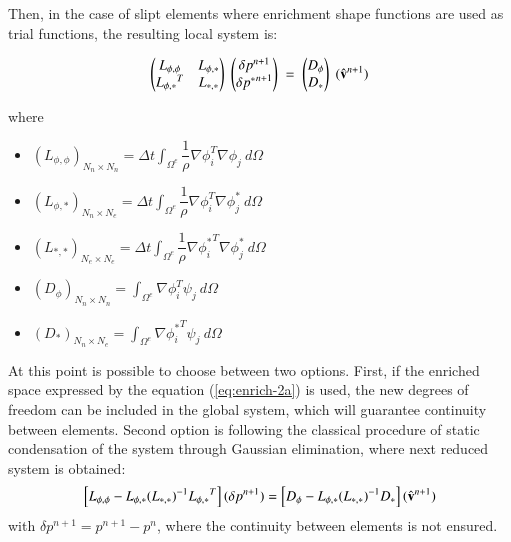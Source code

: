 Then, in the case of slipt elements where enrichment shape functions are used as trial functions, the resulting local system is:

  \begin{equation}
  \label{eqsys-poisson}
   \begin{pmatrix}
      L_{\phi,\phi} & L_{\phi,*}\\
      {L_{\phi,*}}^T & L_{*,*}
   \end{pmatrix}\;
    \begin{pmatrix}
      \delta p^{n+1}\\
      \delta {p^*}^{n+1}
   \end{pmatrix}\; = \;
   \begin{pmatrix}
      D_{\phi}\\
      D_*
   \end{pmatrix}\;
   (\hat{\mathbf{v}}^{n+1})
\end{equation}

where
\begin{itemize}
 \item ${(L_{\phi,\phi})}_{N_n\times N_n} = \Delta t \displaystyle \int_{\Omega^e} \dfrac{1}{\rho} \nabla \phi_i^T \nabla \phi_j \ d\Omega$
 \item ${(L_{\phi,*})}_{N_n\times N_e} = \Delta t \displaystyle \int_{\Omega^e} \dfrac{1}{\rho} \nabla \phi_i^T \nabla \phi_j^* \ d\Omega$
 \item ${(L_{*,*})}_{N_e\times N_e} = \Delta t \displaystyle \int_{\Omega^e} \dfrac{1}{\rho} \nabla {\phi_i^*}^T \nabla \phi_j^* \ d\Omega$
 \item ${(D_{\phi})}_{N_n\times N_n} = \displaystyle \int_{\Omega^e} \nabla \phi_i^T \psi_j \ d\Omega$
 \item ${(D_*)}_{N_n\times N_e} = \displaystyle \int_{\Omega^e}  \nabla {\phi_i^*}^T \psi_j \ d\Omega$
\end{itemize}

At this point is possible to choose between two options. First, if the enriched space expressed by the equation (\ref{eq:enrich-2a}) is used, the new degrees of freedom can be included in the global system, which will guarantee continuity between elements. Second option is following the classical procedure of static condensation of the system through Gaussian elimination\cite{Felippa04}, where next reduced system is obtained:
  \begin{equation}
   \left[L_{\phi,\phi} - L_{\phi,*}{(L_{*,*})}^{-1}{L_{\phi,*}}^T\right](\delta p^{n+1}) = \left[D_{\phi}- L_{\phi,*}{(L_{*,*})}^{-1}D_{*}\right](\hat{\mathbf{v}}^{n+1})
   \label{condensing}
  \end{equation}
with $\delta p^{n+1} = p^{n+1}-p^{n}$, where the continuity between elements is not ensured.

